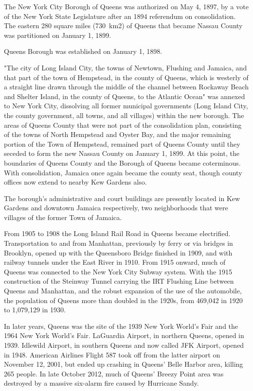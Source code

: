 The New York City Borough of Queens was authorized on May 4, 1897, by a
vote of the New York State Legislature after an 1894 referendum on
consolidation. The eastern 280 square miles (730~km2) of Queens that
became Nassau County was partitioned on January 1, 1899.

Queens Borough was established on January 1, 1898.

"The city of Long Island City, the towns of Newtown, Flushing and
Jamaica, and that part of the town of Hempstead, in the county of
Queens, which is westerly of a straight line drawn through the middle of
the channel between Rockaway Beach and Shelter Island, in the county of
Queens, to the Atlantic Ocean" was annexed to New York City, dissolving
all former municipal governments (Long Island City, the county
government, all towns, and all villages) within the new borough. The
areas of Queens County that were not part of the consolidation plan,
consisting of the towns of North Hempstead and Oyster Bay, and the major
remaining portion of the Town of Hempstead, remained part of Queens
County until they seceded to form the new Nassau County on January 1,
1899. At this point, the boundaries of Queens County and the Borough of
Queens became coterminous. With consolidation, Jamaica once again became
the county seat, though county offices now extend to nearby Kew Gardens
also.

The borough's administrative and court buildings are presently located
in Kew Gardens and downtown Jamaica respectively, two neighborhoods that
were villages of the former Town of Jamaica.

From 1905 to 1908 the Long Island Rail Road in Queens became
electrified. Transportation to and from Manhattan, previously by ferry
or via bridges in Brooklyn, opened up with the Queensboro Bridge
finished in 1909, and with railway tunnels under the East River in 1910.
From 1915 onward, much of Queens was connected to the New York City
Subway system. With the 1915 construction of the Steinway Tunnel
carrying the IRT Flushing Line between Queens and Manhattan, and the
robust expansion of the use of the automobile, the population of Queens
more than doubled in the 1920s, from 469,042 in 1920 to 1,079,129 in
1930.

In later years, Queens was the site of the 1939 New York World's Fair
and the 1964 New York World's Fair. LaGuardia Airport, in northern
Queens, opened in 1939. Idlewild Airport, in southern Queens and now
called JFK Airport, opened in 1948. American Airlines Flight 587 took
off from the latter airport on November 12, 2001, but ended up crashing
in Queens' Belle Harbor area, killing 265 people. In late October 2012,
much of Queens' Breezy Point area was destroyed by a massive six-alarm
fire caused by Hurricane Sandy.

